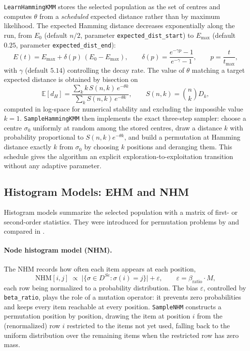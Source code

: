 \documentclass[a4paper,11pt]{article}
\begin{document}
\texttt{LearnHammingKMM} stores the selected population as the set of centres and
computes $\theta$ from a \emph{scheduled} expected distance rather than by
maximum likelihood.  The expected Hamming distance decreases exponentially
along the run, from $E_0$ (default $n/2$, parameter
\texttt{expected\_dist\_start}) to $E_{\max}$ (default $0.25$, parameter
\texttt{expected\_dist\_end}):
\begin{equation}
E(t) = E_{\max} + \delta(p)\,(E_0 - E_{\max}), \qquad
\delta(p) = \frac{e^{-\gamma p} - 1}{e^{-\gamma} - 1}, \qquad
p = \frac{t}{t_{\max}} ,
\end{equation}
with $\gamma$ (default $5.14$) controlling the decay rate.  The value of
$\theta$ matching a target expected distance is obtained by bisection on
\begin{equation}
\mathbb{E}[d_H] = \frac{\sum_{k} k\, S(n,k)\, e^{-\theta k}}
                       {\sum_{k} S(n,k)\, e^{-\theta k}}, \qquad
S(n,k) = \binom{n}{k} D_k ,
\end{equation}
computed in log-space for numerical stability and excluding the impossible value
$k=1$.  \texttt{SampleHammingKMM} then implements the exact three-step sampler:
choose a centre $\sigma_0$ uniformly at random among the stored centres, draw a
distance $k$ with probability proportional to $S(n,k)e^{-\theta k}$, and build a
permutation at Hamming distance exactly $k$ from $\sigma_0$ by choosing $k$
positions and deranging them.  This schedule gives the algorithm an explicit
exploration-to-exploitation transition without any adaptive parameter.

\subsection{Histogram Models: EHM and NHM}

Histogram models summarize the selected population with a matrix of first- or
second-order statistics.  They were introduced for permutation problems by
\cite{Tsutsui:2002} and compared in \cite{Tsutsui_et_al:2006}.

\paragraph{Node histogram model (NHM).}
The NHM records how often each item appears at each position,
\begin{equation}
\mathrm{NHM}[i,j] \;\propto\; \big|\{\sigma \in D^{Se} : \sigma(i) = j\}\big|
   + \varepsilon, \qquad \varepsilon = \beta_{\text{ratio}} \cdot M ,
\end{equation}
each row being normalized to a probability distribution.  The bias
$\varepsilon$, controlled by \texttt{beta\_ratio}, plays the role of a mutation
operator: it prevents zero probabilities and keeps every item reachable at every
position.  \texttt{SampleNHM} constructs a permutation position by position,
drawing the item at position $i$ from the (renormalized) row $i$ restricted to
the items not yet used, falling back to the uniform distribution over the
remaining items when the restricted row has zero mass.
\end{document}
